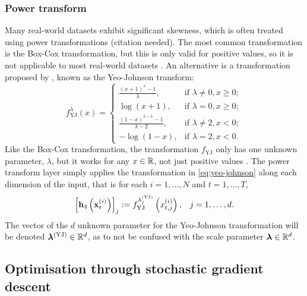 \documentclass{statsmsc}
\begin{document}
{%

\subsubsection{Power transform}%
\label{ssub:Power transform}

Many real-world datasets exhibit significant skewness, which is often treated using power
transformations (citation needed). The most common transformation is the Box-Cox transformation,
but this is only valid for positive values, so it is not applicable to most real-world datasets
\citep{boxcox}. An alternative is a transformation proposed by \citeauthor{yeoJohnson},
known as the Yeo-Johnson transform:
\begin{equation}\label{eq:yeo-johnson}
    f_{\textrm{YJ}}^\lambda(x)= \left\{
        \begin{array}{ll}
            \frac{(x+1)^{\lambda}-1}{\lambda}, & \textrm{if } \lambda \neq 0, x \geq 0; \\
            \log(x + 1), & \textrm{if } \lambda = 0, x \geq 0;  \\
            \frac{(1-x)^{2-\lambda}-1}{\lambda-2} , & \textrm{if } \lambda \neq 2, x < 0; \\
            -\log(1-x), & \textrm{if } \lambda=2, x < 0.
        \end{array}
    \right.
\end{equation}
Like the Box-Cox transformation, the transformation $f_{\textrm{YJ}}$ only has one unknown parameter, $\lambda$, but
it works for any $x \in \mathbb{R}$, not just positive values \citep{yeoJohnson}.
The power transform layer simply applies the transformation in \cref{eq:yeo-johnson} along each dimension of the input, that is for each $i=1,\dots,N$ and $t=1,\dots,T$,
\begin{equation}
    \left[\mathbf{h}_4\left(\mathbf{x}_t^{(i)}\right)\right]_j:=f^{\lambda_j^{(\textrm{YJ})}}_{\textrm{YJ}}\left(x_{t,j}^{(i)}\right), \;\;\; j=1,\dots,d.
\end{equation}
The vector of the $d$ unknown parameter for the Yeo-Johnson transformation will be
denoted $\bm\lambda^{(\textrm{YJ})} \in \mathbb{R}^d$, as to not be confused with the scale parameter
$\bm\lambda \in \mathbb{R}^d$.



\subsection{Optimisation through stochastic gradient descent}%
\label{sub:edain_opt_sgd}

}
\end{document}
